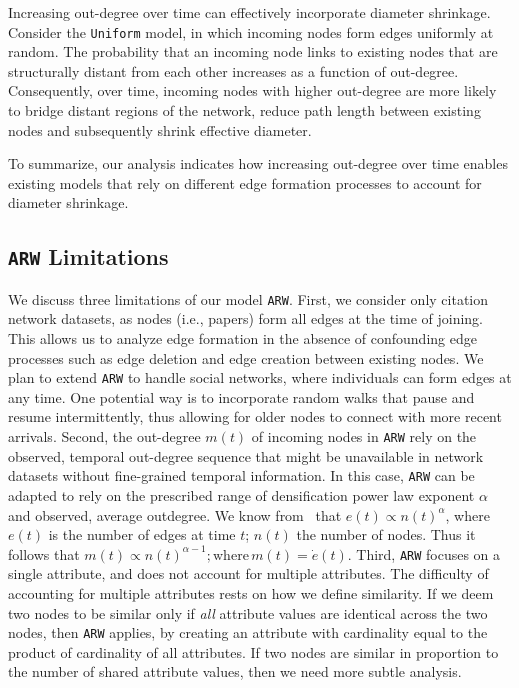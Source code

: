Increasing out-degree over time can effectively incorporate diameter
shrinkage. Consider the \texttt{Uniform} model, in which incoming nodes form
edges uniformly at random. The probability that an incoming node links to
existing nodes that are structurally distant from each other increases as a
function of out-degree. Consequently, over time, incoming nodes with higher
out-degree are more likely to bridge distant regions of the network, reduce path
length between existing nodes and subsequently shrink effective diameter.

To summarize, our analysis indicates how increasing out-degree over time enables
existing models that rely on different edge formation processes to account for
diameter shrinkage.


\subsection{\texttt{ARW} Limitations}
We discuss three limitations of our model \texttt{ARW}. First, we  consider only citation network datasets, as nodes (i.e., papers) form
all edges at the time of joining. This allows us to analyze edge formation in
the absence of confounding edge processes such as edge deletion and edge
creation between existing nodes. We plan to extend \texttt{ARW} to handle social
networks, where individuals can form edges at any time. One potential way is to
incorporate random walks that pause and resume intermittently, thus allowing for
older nodes to connect with more recent arrivals.  
Second, the out-degree $m(t)$ of incoming nodes in \texttt{ARW} rely on the
observed, temporal out-degree sequence that might be unavailable in network
datasets without fine-grained temporal information. In this case, \texttt{ARW}
can be adapted to rely on the prescribed range of densification power law
exponent $\alpha$~\cite{leskovec2005graphs} and observed, average outdegree. We know from~\citet{leskovec2005graphs} that $e(t) \propto n(t)^\alpha$, where $e(t)$ is the number of edges at time $t$; $n(t)$ the number of nodes. Thus it follows that $m(t) \propto n(t)^{\alpha-1}; \mathrm{where}\, m(t) = \dot{e}(t)$.
Third, \texttt{ARW} focuses on a single attribute, and does not account for multiple attributes. The difficulty of accounting for multiple attributes rests on how we define similarity. If we deem two nodes to be similar only if \textit{all} attribute values are identical across the two nodes, then \texttt{ARW} applies, by creating an attribute with cardinality equal to the product of cardinality of all attributes. If two nodes are similar in proportion to the number of shared attribute values, then we need more subtle analysis. 


